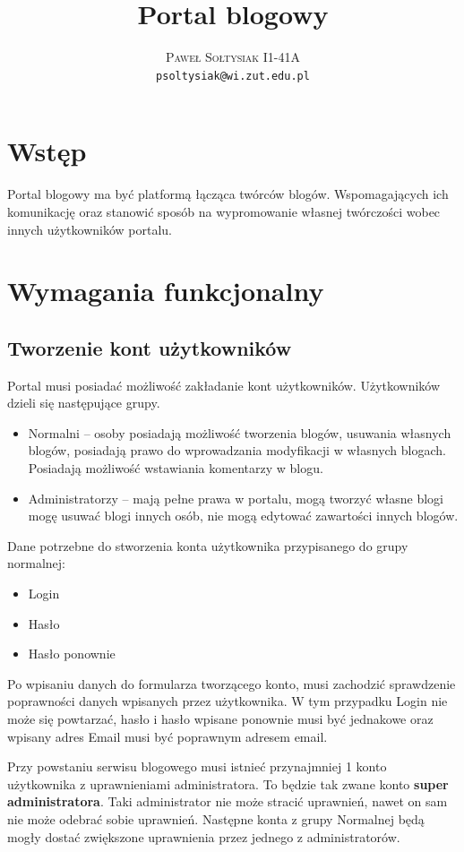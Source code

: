 \documentclass{article}
\title{Portal blogowy}
\author{\textsc{Paweł Sołtysiak I1-41A} \\ \texttt{psoltysiak@wi.zut.edu.pl}}
\begin{document}
\maketitle
\tableofcontents
\section{Wstęp}
Portal blogowy ma być platformą łącząca twórców blogów. Wspomagających ich komunikację oraz stanowić sposób na wypromowanie własnej twórczości wobec innych użytkowników portalu.



\section{Wymagania funkcjonalny}
\subsection{Tworzenie kont użytkowników}
Portal musi posiadać możliwość zakładanie kont użytkowników. Użytkowników dzieli się następujące grupy.
\begin{itemize}
\item Normalni -- osoby posiadają możliwość tworzenia blogów, usuwania własnych blogów, posiadają prawo do wprowadzania modyfikacji w własnych blogach. Posiadają możliwość wstawiania komentarzy w blogu.
\item Administratorzy -- mają pełne prawa w portalu, mogą tworzyć własne blogi mogę usuwać blogi innych osób, nie mogą edytować zawartości innych blogów.
\end{itemize}

Dane potrzebne do stworzenia konta użytkownika przypisanego do grupy normalnej:
\begin{itemize}
\item Login
\item Hasło
\item Hasło ponownie
\end{itemize}

Po wpisaniu danych do formularza tworzącego konto, musi zachodzić sprawdzenie poprawności danych wpisanych przez użytkownika. W tym przypadku Login nie może się powtarzać, hasło i hasło wpisane ponownie musi być jednakowe oraz wpisany adres Email musi być poprawnym adresem email.

Przy powstaniu serwisu blogowego musi istnieć przynajmniej 1 konto użytkownika z uprawnieniami administratora. To będzie tak zwane konto \textbf{super administratora}. Taki administrator nie może stracić uprawnień, nawet on sam nie może odebrać sobie uprawnień. Następne konta z grupy Normalnej będą mogły dostać zwiększone uprawnienia przez jednego z administratorów.
\end{document}
